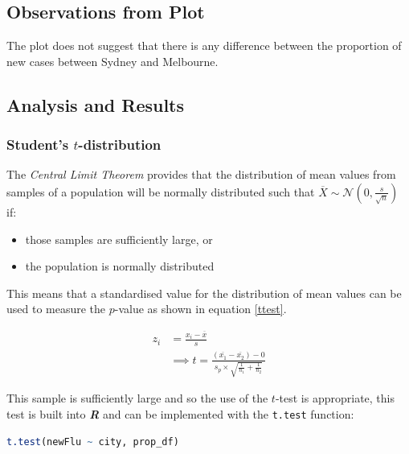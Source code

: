 \documentclass{article}
\newcommand{\passthrough}[1]{#1}
\providecommand{\tightlist}{%
  \setlength{\itemsep}{0pt}\setlength{\parskip}{0pt}}
\begin{document}
\hypertarget{observations-from-plot-1}{%
\subsection{Observations from Plot}\label{observations-from-plot-1}}

The plot does not suggest that there is any difference between the
proportion of new cases between Sydney and Melbourne.

\hypertarget{analysis-and-results-1}{%
\subsection{Analysis and Results}\label{analysis-and-results-1}}

\hypertarget{students-t-distribution}{%
\subsubsection{\texorpdfstring{Student's
\(t\)-distribution}{Student's t-distribution}}\label{students-t-distribution}}

The \emph{Central Limit Theorem} provides that the distribution of mean
values from samples of a population will be normally distributed such
that \(\overline{X} \sim \mathcal{N}\left(0, \frac{s}{\sqrt{n}}\right)\)
if:

\begin{itemize}
\tightlist
\item
  those samples are sufficiently large, or
\item
  the population is normally distributed
\end{itemize}

This means that a standardised value for the distribution of mean values
can be used to measure the \(p\)-value as shown in equation
\eqref{ttest}.

\begin{align}
z_{i}& = \frac{x_i - \overline{x}}{s}\\
& \implies  t= \frac{\left( \overline{x_1} - \overline{x_2} \right) - 0}{s_p \times \sqrt{\frac{1}{n_1} +  \frac{1}{n_2}} } \label{ttest}
\end{align}

This sample is sufficiently large and so the use of the \(t\)-test is
appropriate, this test is built into \textbf{\emph{R}} and can be
implemented with the \passthrough{\lstinline!t.test!} function:

\begin{lstlisting}[language=R]
t.test(newFlu ~ city, prop_df)
\end{lstlisting}
\end{document}
